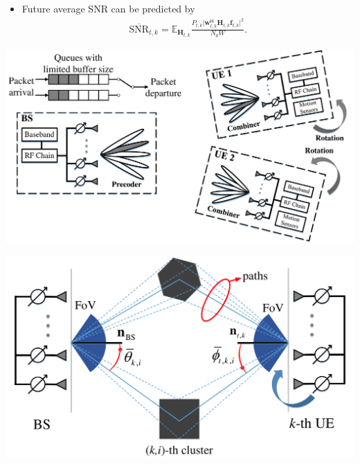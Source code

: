 \documentclass[paperwidth=46.8in,paperheight=26.3in,fontscale=0.35]{baposter}
\begin{document}
\begin{poster}
{\begin{minipage}[t]{0.54\linewidth}
\begin{itemize}
                \item Future average SNR can be predicted by
                      \begin{align*}
                          \overline{\textrm{SNR}}_{t,k}
                          =
                          \mathbb{E}_{\mathbf{H}_{t,k}}\frac{P_{t,k}\big|\mathbf{w}_{t,k}^{\mathsf{H}}\mathbf{H}_{t,k}\mathbf{f}_{t,k}\big|^{2}}{N_{0}W}.
                      \end{align*}
            \end{itemize}
        \end{minipage}
        \hfill
        \begin{minipage}[t]{0.44\linewidth}
            \vspace{0.0em}
            \begin{center}
                \includegraphics[width=\textwidth]{fig/system_model_v1_4a.pdf}
            \end{center}
            \begin{center}
                \includegraphics[width=\textwidth]{fig/system_model_v1_4b.pdf}
            \end{center}
        \end{minipage}
    }


\end{poster}
\end{document}

